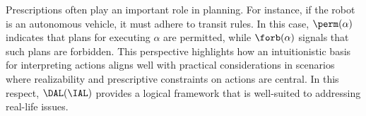Prescriptions often play an important role in planning.
For instance, if the robot is an autonomous vehicle, it must adhere to transit rules.
In this case, $\perm(\alpha)$ indicates that plans for executing $\alpha$ are permitted, while $\forb(\alpha)$ signals that such plans are forbidden.
This perspective highlights how an intuitionistic basis for interpreting actions aligns well with practical considerations in scenarios where realizability and prescriptive constraints on actions are central.
In this respect, $\DAL(\IAL)$ provides a logical framework that is well-suited to addressing real-life issues.


